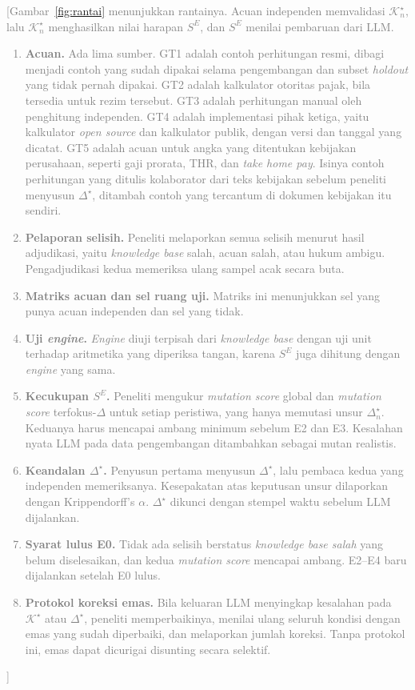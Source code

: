 \documentclass[journal,a4paper]{IEEEtran}
\newcommand{\en}[1]{\textit{#1}}
\newcommand{\K}{\mathcal{K}}
\newcommand{\emas}{\star}
\newcommand{\SE}{S^{E}}
\newif\ifrancangan \rancangantrue
\newcommand{\isian}[1]{\ifrancangan\textcolor{gray}{[#1]}\fi}
\begin{document}
\isian{Gambar~\ref{fig:rantai} menunjukkan rantainya. Acuan independen memvalidasi $\K^{\emas}_n$, lalu $\K^{\emas}_n$ menghasilkan nilai harapan $\SE$, dan $\SE$ menilai pembaruan dari LLM.
\begin{enumerate}[leftmargin=*,nosep]
  \item \textbf{Acuan.} Ada lima sumber. GT1 adalah contoh perhitungan resmi, dibagi menjadi contoh yang sudah dipakai selama pengembangan dan subset \en{holdout} yang tidak pernah dipakai. GT2 adalah kalkulator otoritas pajak, bila tersedia untuk rezim tersebut. GT3 adalah perhitungan manual oleh penghitung independen. GT4 adalah implementasi pihak ketiga, yaitu kalkulator \en{open source} dan kalkulator publik, dengan versi dan tanggal yang dicatat. GT5 adalah acuan untuk angka yang ditentukan kebijakan perusahaan, seperti gaji prorata, THR, dan \en{take home pay}. Isinya contoh perhitungan yang ditulis kolaborator dari teks kebijakan sebelum peneliti menyusun $\Delta^{\emas}$, ditambah contoh yang tercantum di dokumen kebijakan itu sendiri.
  \item \textbf{Pelaporan selisih.} Peneliti melaporkan semua selisih menurut hasil adjudikasi, yaitu \en{knowledge base} salah, acuan salah, atau hukum ambigu. Pengadjudikasi kedua memeriksa ulang sampel acak secara buta.
  \item \textbf{Matriks acuan dan sel ruang uji.} Matriks ini menunjukkan sel yang punya acuan independen dan sel yang tidak.
  \item \textbf{Uji \en{engine}.} \en{Engine} diuji terpisah dari \en{knowledge base} dengan uji unit terhadap aritmetika yang diperiksa tangan, karena $\SE$ juga dihitung dengan \en{engine} yang sama.
  \item \textbf{Kecukupan $\SE$.} Peneliti mengukur \en{mutation score} global dan \en{mutation score} terfokus-$\Delta$ untuk setiap peristiwa, yang hanya memutasi unsur $\Delta^{\emas}_n$. Keduanya harus mencapai ambang minimum sebelum E2 dan E3. Kesalahan nyata LLM pada data pengembangan ditambahkan sebagai mutan realistis.
  \item \textbf{Keandalan $\Delta^{\emas}$.} Penyusun pertama menyusun $\Delta^{\emas}$, lalu pembaca kedua yang independen memeriksanya. Kesepakatan atas keputusan unsur dilaporkan dengan Krippendorff's $\alpha$. $\Delta^{\emas}$ dikunci dengan stempel waktu sebelum LLM dijalankan.
  \item \textbf{Syarat lulus E0.} Tidak ada selisih berstatus \emph{knowledge base salah} yang belum diselesaikan, dan kedua \en{mutation score} mencapai ambang. E2--E4 baru dijalankan setelah E0 lulus.
  \item \textbf{Protokol koreksi emas.} Bila keluaran LLM menyingkap kesalahan pada $\K^{\emas}$ atau $\Delta^{\emas}$, peneliti memperbaikinya, menilai ulang seluruh kondisi dengan emas yang sudah diperbaiki, dan melaporkan jumlah koreksi. Tanpa protokol ini, emas dapat dicurigai disunting secara selektif.
\end{enumerate}}
\end{document}
